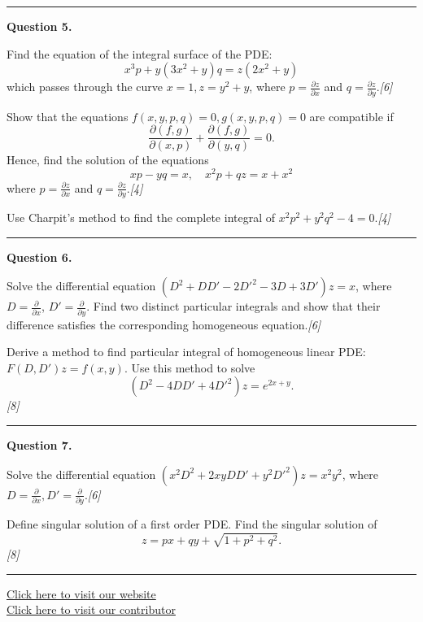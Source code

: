 \documentclass[11pt,a4paper]{article}
\newcommand{\pts}[1]{\hfill   \textit{[#1]}}
\begin{document}
\medskip\rule{\linewidth}{0.2pt}\medskip




\noindent   \textbf{Question 5.}

\begin{parts}
  \item Find the equation of the integral surface of the PDE:
  \[
    x^3 p + y(3x^2 + y)q = z(2x^2 + y)
  \]
  which passes through the curve $x = 1, z = y^2 + y$, where $p = \frac{\partial z}{\partial x}$ and $q = \frac{\partial z}{\partial y}$.\pts{6}
  \item
  
\begin{parts}
    \item Show that the equations $f(x, y, p, q) = 0, g(x, y, p, q) = 0$ are compatible if
    \[
      \frac{\partial(f, g)}{\partial(x, p)} + \frac{\partial(f, g)}{\partial(y, q)} = 0.
    \]
    Hence, find the solution of the equations
    \[
      xp - yq = x, \quad x^2 p + qz = x + x^2
    \]
    where $p = \frac{\partial z}{\partial x}$ and $q = \frac{\partial z}{\partial y}$.\pts{4}
    \item Use Charpit's method to find the complete integral of $x^2 p^2 + y^2 q^2 - 4 = 0$.\pts{4}
  \end{parts}
\end{parts}

\medskip\rule{\linewidth}{0.2pt}\medskip




\noindent   \textbf{Question 6.}

\begin{parts}
  \item Solve the differential equation $(D^2 + DD' - 2D'^2 - 3D + 3D') z = x$, where $D = \frac{\partial}{\partial x}$, $D' = \frac{\partial}{\partial y}$. Find two distinct particular integrals and show that their difference satisfies the corresponding homogeneous equation.\pts{6}
  \item Derive a method to find particular integral of homogeneous linear PDE: $F(D, D') z = f(x, y)$. Use this method to solve
  \[
    (D^2 - 4DD' + 4D'^2) z = e^{2x + y}.
  \]\pts{8}
\end{parts}

\medskip\rule{\linewidth}{0.2pt}\medskip




\noindent   \textbf{Question 7.}

\begin{parts}
  \item Solve the differential equation $(x^2 D^2 + 2xy DD' + y^2 D'^2) z = x^2 y^2$, where $D = \frac{\partial}{\partial x}, D' = \frac{\partial}{\partial y}$.\pts{6}
  \item Define singular solution of a first order PDE. Find the singular solution of
  \[
    z = px + qy + \sqrt{1 + p^2 + q^2}.
  \]\pts{8}
\end{parts}

\vfill
\rule{\linewidth}{0.4pt}

\begin{center}\small
\href{https://bhu-exam.vercel.app/}{Click here to visit our website}\\[4pt]
\href{https://me-aryan.vercel.app/}{Click here to visit our contributor}
\end{center}
\end{document}
